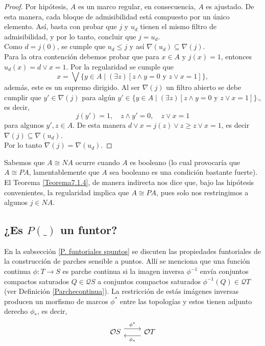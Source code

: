 \begin{proof}
    Por hipótesis, $A$ es un marco regular, en consecuencia, $A$ es ajustado. De esta manera, cada bloque de admisibilidad está compuesto por un único elemento. Así, basta con probar que $j$ y $u_d$ tienen el mismo filtro de admisibilidad, y por lo tanto, concluir que $j=u_d$.\\

    Como $d=j(0)$, se cumple que $u_d\leq j$ y así $\nabla(u_d)\subseteq \nabla(j)$.\\
    
    Para la otra contención debemos probar que para $x\in A$ y $j(x)=1$, entonces $u_d(x)=d\vee x=1$. Por la regularidad se cumple que 
    \[
    x=\bigvee\{y\in A\mid (\exists z)[z\wedge y=0 \mbox{ y } z\vee x=1]\},
    \]
    además, este es un supremo dirigido. Al ser $\nabla(j)$ un filtro abierto se debe cumplir que $y'\in\nabla(j)$ para algún $y'\in \{y\in A\mid (\exists z)[z\wedge y=0 \mbox{ y } z\vee x=1]\}$., es decir,
    \[
    j(y')=1, \quad z\wedge y'=0, \quad z\vee x=1
    \]
    para algunos $y', z\in A$. De esta manera $d\vee x=j(z)\vee z\geq z\vee x=1$, es decir $\nabla(j)\subseteq\nabla(u_d)$.\\

    Por lo tanto $\nabla(j)=\nabla(u_d)$.
\end{proof}

Sabemos que $A\cong NA$ ocurre cuando $A$ es booleano (lo cual provocaría que $A\cong PA$, lamentablemente que $A$ sea booleano es una condición bastante fuerte). El Teorema \ref{Teorema7.1.4}, de manera indirecta nos dice que, bajo las hipótesis convenientes, la regularidad implica que $A\cong PA$, pues solo nos restringimos a algunos $j\in NA$.

\subsection{¿Es $P( \_ )$ un funtor?}

En la subsección \ref{P. funtoriales spuntos} se discuten las propiedades funtoriales de la construcción de parches sensible a puntos. Allí se menciona que una función continua $\phi\colon T\to S$ es parche continua si la imagen inversa $\phi^{-1}$ envía conjuntos compactos saturados $Q\in \mathcal{Q}S$ a conjuntos compactos saturados $\phi^{-1}(Q)\in \mathcal{Q}T$ (ver Definición \ref{Parchecontinua}). La restricción de estás imágenes inversas producen un morfismo de marcos $\phi^*$ entre las topologías y estos tienen adjunto derecho $\phi_*$, es decir,
\[\begin{tikzcd}
	{\mathcal{O}S} & {\mathcal{O}T}
	\arrow["{\phi^*}", shift left=2, from=1-1, to=1-2]
	\arrow["{\phi_*}", shift left=2, from=1-2, to=1-1]
\end{tikzcd}\]

